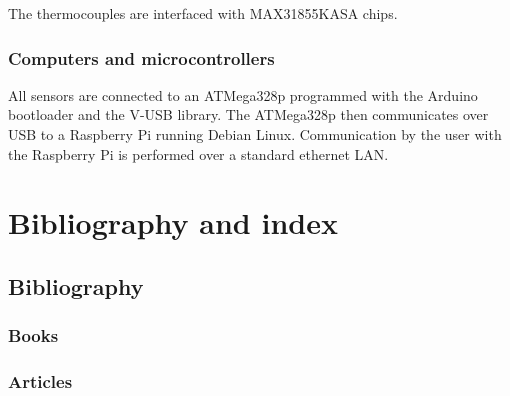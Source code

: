 \documentclass[11pt,fleqn,openany]{book} %
\begin{document}
The thermocouples are interfaced with MAX31855KASA chips.

\section{Computers and microcontrollers}

All sensors are connected to an ATMega328p programmed with the Arduino bootloader and the V-USB library. The ATMega328p then communicates over USB to a Raspberry Pi running Debian Linux. Communication by the user with the Raspberry Pi is performed over a standard ethernet LAN.




\part{Bibliography and index}



\chapter*{Bibliography}
\section*{Books}
\printbibliography[heading=bibempty,type=book]
\section*{Articles}
\printbibliography[heading=bibempty,type=article]


\cleardoublepage
\setlength{\columnsep}{0.75cm}
\printindex

\end{document}
